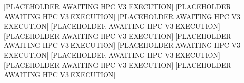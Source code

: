 [PLACEHOLDER AWAITING HPC V3 EXECUTION]
[PLACEHOLDER AWAITING HPC V3 EXECUTION]
[PLACEHOLDER AWAITING HPC V3 EXECUTION]
[PLACEHOLDER AWAITING HPC V3 EXECUTION]
[PLACEHOLDER AWAITING HPC V3 EXECUTION]
[PLACEHOLDER AWAITING HPC V3 EXECUTION]
[PLACEHOLDER AWAITING HPC V3 EXECUTION]
[PLACEHOLDER AWAITING HPC V3 EXECUTION]
[PLACEHOLDER AWAITING HPC V3 EXECUTION]
[PLACEHOLDER AWAITING HPC V3 EXECUTION]
